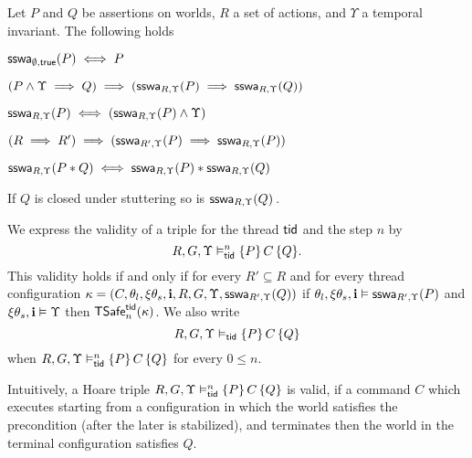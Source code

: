 \begin{lemma}
\label{lem:sswa}
Let $P$ and $Q$ be assertions on worlds,  $R$  a  set of actions, 
and  $\Upsilon$ a temporal invariant. The following holds
\begin{compactenum}[(i)]
\item \label{lem:sswa:empty}
$\sswa{P}{\emptyset}{\true}  \iff P$

\item \label{lem:sswa:imp}
$(P \land \Upsilon \implies Q) \implies (\sswa{P}{R}{\Upsilon} \implies \sswa{Q}{R}{\Upsilon})$

\item \label{lem:sswa:withinv}
$\sswa{P}{R}{\Upsilon}  \iff (\sswa{P}{R}{\Upsilon} \land \Upsilon)$


\item \label{lem:sswa:impr}
$(R \implies R')  \implies (\sswa{P}{R'}{\Upsilon} \implies \sswa{P}{R}{\Upsilon})$

\item  \label{lem:sswa:star}
$\sswa{P*Q}{R}{\Upsilon} \iff \sswa{P}{R}{\Upsilon} * \sswa{Q}{R}{\Upsilon}$

\item  \label{lem:sswa:stutter}
If $Q$ is closed under stuttering so is $\sswa{Q}{R}{\Upsilon}$\,.
\end{compactenum}
\end{lemma}

\begin{defin}\label{def:semtriple}
We express the validity of a triple for the thread $\ltid$ and the step $n$ by
$$
R,G,\Upsilon \tvDash^n \{ P \} \, C \, \{ Q \}.
$$
This validity holds if and only if
for every $R' \subseteq R$ and
for every thread configuration 
$\kappa = 
(C,\theta_l,\xi\theta_s,\intp,R,G,\Upsilon, \sswa{Q}{R'}{\Upsilon})$
if
$\theta_l,\xi\theta_s,\intp \vDash \sswa{P}{R'}{\Upsilon}$ and
$\xi\theta_s,\intp \vDash \Upsilon$
then 
$\safe_n(\kappa)$. We also write
$$
R,G,\Upsilon \tvDash \{ P \} \, C \, \{ Q \}
$$
when
$R,G,\Upsilon \tvDash^n \{ P \} \, C \, \{ Q \}$ for every $0 \leq n$.
%
%
\end{defin}
Intuitively, a Hoare triple $R,G,\Upsilon \tvDash^n \{ P \} \, C \, \{ Q \}$ is valid, if 
a command $C$ which executes starting from a configuration in which the  world satisfies the 
precondition (after the later is stabilized), and terminates then the world in the terminal configuration satisfies $Q$.

